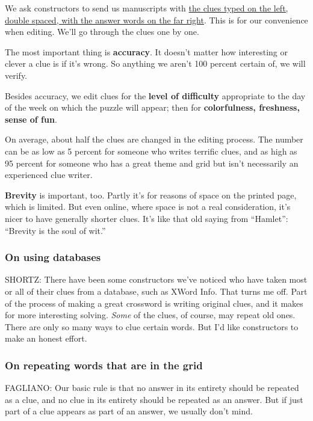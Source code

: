 We ask constructors to send us manuscripts with
\href{https://www.nytimes3xbfgragh.onion/crosswords/submissions}{the
clues typed on the left, double spaced, with the answer words on the far
right}. This is for our convenience when editing. We'll go through the
clues one by one.

The most important thing is \textbf{accuracy}. It doesn't matter how
interesting or clever a clue is if it's wrong. So anything we aren't 100
percent certain of, we will verify.

Besides accuracy, we edit clues for the \textbf{level of difficulty}
appropriate to the day of the week on which the puzzle will appear; then
for \textbf{colorfulness, freshness, sense of fun}.

On average, about half the clues are changed in the editing process. The
number can be as low as 5 percent for someone who writes terrific clues,
and as high as 95 percent for someone who has a great theme and grid but
isn't necessarily an experienced clue writer.

\textbf{Brevity} is important, too. Partly it's for reasons of space on
the printed page, which is limited. But even online, where space is not
a real consideration, it's nicer to have generally shorter clues. It's
like that old saying from ``Hamlet'': ``Brevity is the soul of wit.''

\hypertarget{on-using-databases}{%
\subsubsection{On using databases}\label{on-using-databases}}

SHORTZ: There have been some constructors we've noticed who have taken
most or all of their clues from a database, such as XWord Info. That
turns me off. Part of the process of making a great crossword is writing
original clues, and it makes for more interesting solving. \emph{Some}
of the clues, of course, may repeat old ones. There are only so many
ways to clue certain words. But I'd like constructors to make an honest
effort.

\hypertarget{on-repeating-words-that-are-in-the-grid}{%
\subsubsection{On repeating words that are in the
grid}\label{on-repeating-words-that-are-in-the-grid}}

FAGLIANO: Our basic rule is that no answer in its entirety should be
repeated as a clue, and no clue in its entirety should be repeated as an
answer. But if just part of a clue appears as part of an answer, we
usually don't mind.

